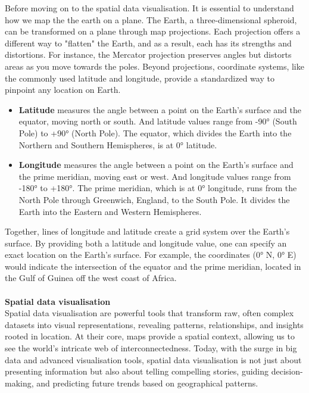 \documentclass{article}\usepackage[]{graphicx}\usepackage[]{xcolor}
\begin{document}
Before moving on to the spatial data visualisation. It is essential to understand how we map the the earth on a plane. The Earth, a three-dimensional spheroid, can be transformed on a plane through map projections. Each projection offers a different way to "flatten" the Earth, and as a result, each has its strengths and distortions. For instance, the Mercator projection preserves angles but distorts areas as you move towards the poles. Beyond projections, coordinate systems, like the commonly used latitude and longitude, provide a standardized way to pinpoint any location on Earth.

\begin{itemize}
\item \textbf{Latitude} measures the angle between a point on the Earth's surface and the equator, moving north or south. And latitude values range from -90° (South Pole) to +90° (North Pole). The equator, which divides the Earth into the Northern and Southern Hemispheres, is at 0° latitude.
\item \textbf{Longitude} measures the angle between a point on the Earth's surface and the prime meridian, moving east or west.
And longitude values range from -180° to +180°. The prime meridian, which is at 0° longitude, runs from the North Pole through Greenwich, England, to the South Pole. It divides the Earth into the Eastern and Western Hemispheres.
\end{itemize}

Together, lines of longitude and latitude create a grid system over the Earth's surface. By providing both a latitude and longitude value, one can specify an exact location on the Earth's surface. For example, the coordinates (0° N, 0° E) would indicate the intersection of the equator and the prime meridian, located in the Gulf of Guinea off the west coast of Africa.
\\\\
\noindent
\textbf{Spatial data visualisation}\\
Spatial data visualisation are powerful tools that transform raw, often complex datasets into visual representations, revealing patterns, relationships, and insights rooted in location. At their core, maps provide a spatial context, allowing us to see the world's intricate web of interconnectedness. Today, with the surge in big data and advanced visualisation tools, spatial data visualisation is not just about presenting information but also about telling compelling stories, guiding decision-making, and predicting future trends based on geographical patterns.
\end{document}

